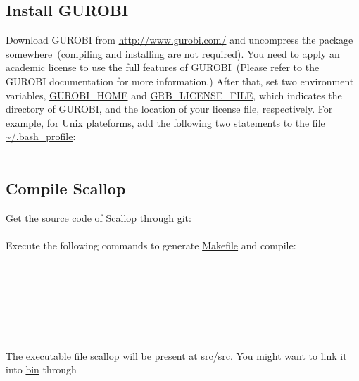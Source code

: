 \documentclass{llncs}
\begin{document}
\subsection{Install GUROBI}
Download GUROBI from \url{http://www.gurobi.com/} and uncompress the
package somewhere~(compiling and installing are not required).
You need to apply an academic license to use
the full features of GUROBI~(Please refer to the GUROBI documentation for more information.)
After that, set two environment
variables, \url{GUROBI_HOME} and \url{GRB_LICENSE_FILE}, which indicates the directory of GUROBI, and
the location of your license file, respectively.
For example, for Unix plateforms, add the following
two statements to the file \url{~/.bash_profile}:\\
\\

\subsection{Compile Scallop}
Get the source code of Scallop through \url{git}:\\
\\
Execute the following commands to generate \url{Makefile} and compile:\\
\\
\\
\\
\\
\\
\\
\\
The executable file \url{scallop} will be present at \url{src/src}.
You might want to link it into \url{bin} through\\
\\
\end{document}
